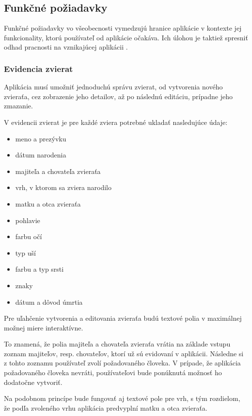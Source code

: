\subsection{Funkčné požiadavky}\label{funkcne-poziadavky}
Funkčné požiadavky vo všeobecnosti vymedzujú hranice aplikácie v kontexte jej funkcionality, ktorú používateľ od aplikácie očakáva. Ich úlohou je taktiež spresniť odhad pracnosti na vznikajúcej aplikácii \cite{co-su-pripady-pouzitia}.

\subsubsection{Evidencia zvierat}\label{evidencia-zvierat}
Aplikácia musí umožniť jednoduchú správu zvierat, od vytvorenia nového zvieraťa, cez zobrazenie jeho detailov, až po následnú editáciu, prípadne jeho zmazanie.

\hfill \break
V evidencii zvierat je pre každé zviera potrebné ukladať nasledujúce údaje:

\begin{itemize}
	\item meno a prezývku
	\item dátum narodenia
	\item majiteľa a chovateľa zvieraťa
	\item vrh, v ktorom sa zviera narodilo
	\item matku a otca zvieraťa
	\item pohlavie
	\item farbu očí
	\item typ uší
	\item farbu a typ srsti
	\item znaky
	\item dátum a dôvod úmrtia
\end{itemize}

Pre uľahčenie vytvorenia a editovania zvieraťa budú textové polia v maximálnej možnej miere interaktívne.

To znamená, že polia majiteľa a chovateľa zvieraťa vrátia na základe vstupu zoznam majiteľov, resp. chovateľov, ktorí už sú evidovaní v aplikácii. Následne si z tohto zoznamu používateľ zvolí požadovaného človeka.
V prípade, že aplikácia požadovaného človeka nevráti, používateľovi bude ponúknutá možnosť ho dodatočne vytvoriť.

Na podobnom princípe bude fungovať aj textové pole pre vrh, s tým rozdielom, že podľa zvoleného vrhu aplikácia predvyplní matku a otca zvieraťa.
 
